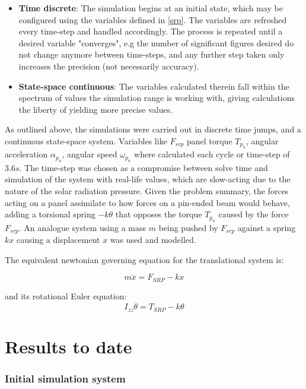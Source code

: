 \begin{itemize}
    \item \textbf{Time discrete}: The simulation begins at an initial state, which may be configured using the variables defined in \ref{srp}. The variables are refreshed every time-step and handled accordingly. The process is repeated until a desired variable "converges", e.g the number of sig\-ni\-fi\-cant figures desired do not change anymore between time-steps, and any further step taken only increases the precision (not necessarily accuracy).
    \item \textbf{State-space continuous}: The variables calculated therein fall within the spectrum of values the simulation range is working with, giving calculations the liberty of yielding more precise values.
\end{itemize}

As outlined above, the simulations were carried out in discrete time jumps, and a continuous state-space system. Variables like $F_{srp}$ panel torque $T_{p_n}$, angular acceleration $\alpha_{p_n}$, angular speed $\omega_{p_n}$ where calculated each cycle or time-step of $3.6s$. The time-step was chosen as a compromise between solve time and simulation of the system with real-life values, which are slow-acting due to the nature of the solar radiation pressure.
Given the problem summary, the forces acting on a panel assimilate to how forces on a pin-ended beam would behave, adding a torsional spring $-k\theta$ that opposes the torque $T_{p_n}$ caused by the force $F_{srp}$. An analogue system using a mass $m$ being pushed by $F_{srp}$ against a spring $kx$ causing a displacement $x$ was used and modelled.

The equivalent newtonian governing equation for the translational system is:

\begin{equation}
    m\ddot{x} = F_{SRP} - kx
\end{equation}


and its rotational Euler equation:
\begin{equation}
I_{zz} \ddot{\theta} = T_{SRP} - k\theta
\end{equation}


\section{Results to date}
\subsubsection{Initial simulation system}


